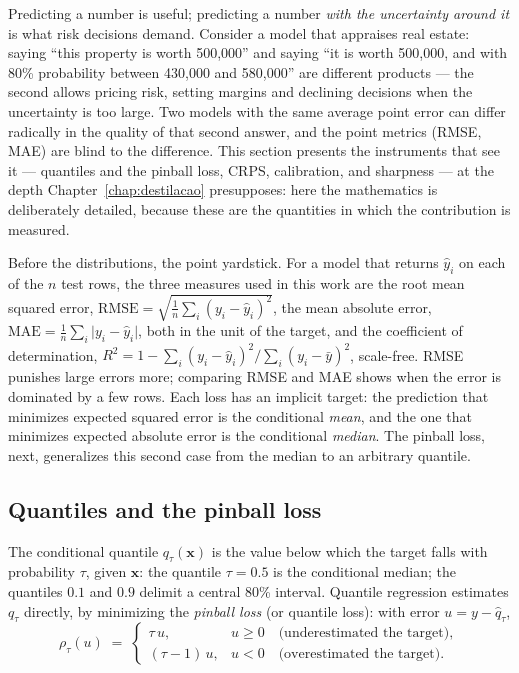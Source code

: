 Predicting a number is useful; predicting a number \emph{with the
uncertainty around it} is what risk decisions demand. Consider a
model that appraises real estate: saying ``this property is worth
500{,}000'' and saying ``it is worth 500{,}000, and with 80\%
probability between 430{,}000 and 580{,}000'' are different products
--- the second allows pricing risk, setting margins and declining
decisions when the uncertainty is too large. Two models with the
same average point error can differ radically in the quality of that
second answer, and the point metrics (RMSE, MAE) are blind to the
difference. This section presents the instruments that see it ---
quantiles and the pinball loss, CRPS, calibration, and sharpness ---
at the depth Chapter~\ref{chap:destilacao} presupposes: here the
mathematics is deliberately detailed, because these are the
quantities in which the contribution is measured.

Before the distributions, the point yardstick. For a model that
returns $\hat y_i$ on each of the $n$ test rows, the three measures
used in this work are the root mean squared error,
$\mathrm{RMSE} = \sqrt{\tfrac{1}{n}\sum_i (y_i - \hat y_i)^2}$, the
mean absolute error,
$\mathrm{MAE} = \tfrac{1}{n}\sum_i \lvert y_i - \hat y_i \rvert$,
both in the unit of the target, and the coefficient of
determination,
$R^2 = 1 - \sum_i (y_i - \hat y_i)^2 / \sum_i (y_i - \bar y)^2$,
scale-free. RMSE punishes large errors more; comparing RMSE and MAE
shows when the error is dominated by a few rows. Each loss has an
implicit target: the prediction that minimizes expected squared
error is the conditional \emph{mean}, and the one that minimizes
expected absolute error is the conditional \emph{median}. The
pinball loss, next, generalizes this second case from the median to
an arbitrary quantile.

\subsection{Quantiles and the pinball loss}

The conditional quantile $q_\tau(\mathbf{x})$ is the value below
which the target falls with probability $\tau$, given $\mathbf{x}$:
the quantile $\tau = 0.5$ is the conditional median; the quantiles
$0.1$ and $0.9$ delimit a central 80\% interval. Quantile
regression \citep{koenker1978} estimates $q_\tau$ directly, by
minimizing the \emph{pinball loss} (or quantile loss): with error
$u = y - \hat{q}_\tau$,
\begin{equation}
  \rho_\tau(u) \;=\;
  \begin{cases}
    \tau\, u, & u \geq 0 \quad \text{(underestimated the target)},\\[2pt]
    (\tau - 1)\, u, & u < 0 \quad \text{(overestimated the target)}.
  \end{cases}
  \label{eq:pinball}
\end{equation}

